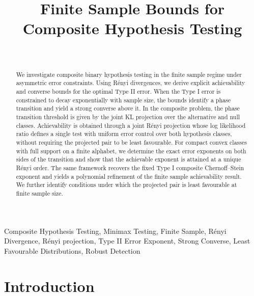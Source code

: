 \documentclass[journal,10pt,draftclsnofoot,onecolumn]{IEEEtran}
\begin{document}
\title{Finite Sample Bounds for Composite Hypothesis Testing}
\author{\\
 }

\maketitle


\begin{abstract}
We investigate composite binary hypothesis testing in the finite sample regime under asymmetric error constraints. Using R\'enyi divergences, we derive explicit
achievability and converse bounds for the optimal Type II error. When the Type I error is constrained to decay exponentially with sample size, the bounds identify a phase transition and yield a strong converse above it. In the composite problem, the phase transition threshold is given by the joint KL projection over the alternative and null classes. Achievability is obtained through a joint R\'enyi projection whose log likelihood ratio defines a single test with uniform error control over both hypothesis classes, without requiring the projected pair to be least favourable. For compact convex classes with full support on a finite alphabet, we determine the exact error exponents on both sides of the transition and show that the achievable exponent is attained at a unique R\'enyi order. The same framework recovers the fixed Type I composite Chernoff--Stein exponent and yields a polynomial refinement of the finite sample achievability result. We further identify conditions under which the projected pair is least favourable at finite sample size.
\end{abstract}
\begin{IEEEkeywords}
Composite Hypothesis Testing, Minimax Testing, Finite Sample, R\'enyi Divergence, R\'enyi projection, Type II Error Exponent, Strong Converse, Least Favourable Distributions, Robust Detection
\end{IEEEkeywords}

\section{Introduction}
\label{sec:introduction}
\end{document}
